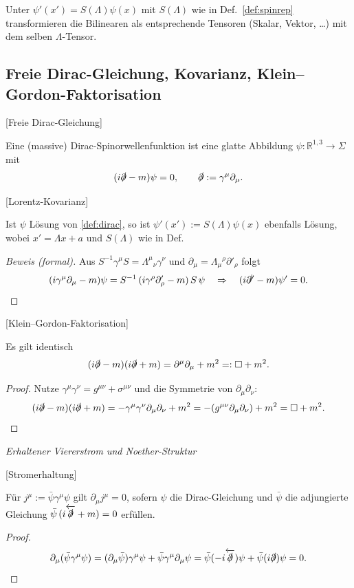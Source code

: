 \documentclass[10pt, letterpaper]{article}
\newcommand{\R}{\mathbb{R}}
\begin{document}
Unter $\psi'(x')=S(\Lambda)\psi(x)$ mit $S(\Lambda)$ wie in Def.~\ref{def:spinrep} transformieren die Bilinearen als entsprechende Tensoren (Skalar, Vektor, \dots) mit dem selben $\Lambda$-Tensor.


\subsection{Freie Dirac-Gleichung, Kovarianz, Klein--Gordon-Faktorisation}

[Freie Dirac-Gleichung]

Eine (massive) Dirac-Spinorwellenfunktion ist eine glatte Abbildung $\psi:\R^{1,3}\to \Sigma$ mit
\[
(i\slashed{\partial}-m)\psi=0,\qquad \slashed{\partial}:=\gamma^\mu \partial_\mu.
\]


[Lorentz-Kovarianz]

Ist $\psi$ Lösung von \eqref{def:dirac}, so ist $\psi'(x'):=S(\Lambda)\psi(x)$ ebenfalls Lösung, wobei $x'=\Lambda x+a$ und $S(\Lambda)$ wie in Def.


\begin{proof}[Beweis (formal)]
Aus $S^{-1}\gamma^\mu S = \Lambda^\mu{}_\nu \gamma^\nu$ und $\partial_\mu = \Lambda_\mu{}^\rho \partial'_\rho$ folgt
\[
(i\gamma^\mu \partial_\mu - m)\psi
= S^{-1}\,(i\gamma^\rho \partial'_\rho - m)\,S\,\psi
\quad\Rightarrow\quad (i\slashed{\partial'}-m)\psi'=0.
\]
\end{proof}

[Klein--Gordon-Faktorisation]

Es gilt identisch
\[
(i\slashed{\partial}-m)(i\slashed{\partial}+m) = \partial^\mu\partial_\mu + m^2 =: \Box + m^2.
\]


\begin{proof}
Nutze $\gamma^\mu\gamma^\nu = g^{\mu\nu} + \sigma^{\mu\nu}$ und die Symmetrie von $\partial_\mu\partial_\nu$:
\[
(i\slashed{\partial}-m)(i\slashed{\partial}+m) 
= -\gamma^\mu\gamma^\nu \partial_\mu\partial_\nu + m^2
= -(g^{\mu\nu}\partial_\mu\partial_\nu) + m^2 = \Box + m^2.
\]
\end{proof}

\emph{Erhaltener Viererstrom und Noether-Struktur}

[Stromerhaltung]

Für $j^\mu:=\bar\psi \gamma^\mu \psi$ gilt $\partial_\mu j^\mu=0$, sofern $\psi$ die Dirac-Gleichung und $\bar\psi$ die adjungierte Gleichung
\(
\bar\psi\, (i\overleftarrow{\slashed{\partial}} + m)=0
\)
erfüllen.


\begin{proof}
\[
\partial_\mu(\bar\psi \gamma^\mu \psi)
= (\partial_\mu\bar\psi)\gamma^\mu \psi + \bar\psi \gamma^\mu \partial_\mu \psi
= \bar\psi (-i\overleftarrow{\slashed{\partial}})\psi + \bar\psi (i\slashed{\partial})\psi = 0.
\]
\end{proof}
\end{document}
